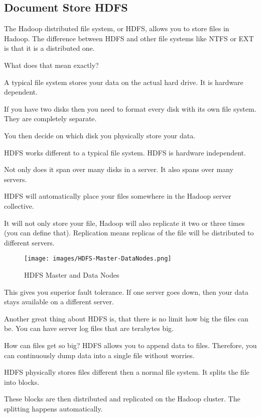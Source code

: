 \documentclass[12pt, numbers=noenddot]{scrreprt} %
\begin{document}
\subsection{Document Store HDFS}

The Hadoop distributed file system, or HDFS, allows you to store files in Hadoop. The difference between HDFS and other file systems like NTFS or EXT is that it is a distributed one.

What does that mean exactly?

A typical file system stores your data on the actual hard drive. It is hardware dependent.

If you have two disks then you need to format every disk with its own file system. They are completely separate.

You then decide on which disk you physically store your data.

HDFS works different to a typical file system. HDFS is hardware independent.

Not only does it span over many disks in a server. It also spans over many servers.

HDFS will automatically place your files somewhere in the Hadoop server collective.

It will not only store your file, Hadoop will also replicate it two or three times (you can define that). Replication means replicas of the file will be distributed to different servers.

\begin{figure}[htbp]
  \centering
     \texttt{[image: images/HDFS-Master-DataNodes.png]}
  \caption{HDFS Master and Data Nodes}
  \label{fig:Bild1}
\end{figure}

This gives you superior fault tolerance. If one server goes down, then your data stays available on a different server.

Another great thing about HDFS is, that there is no limit how big the files can be. You can have server log files that are terabytes big.

How can files get so big? HDFS allows you to append data to files. Therefore, you can continuously dump data into a single file without worries.

HDFS physically stores files different then a normal file system. It splits the file into blocks.

These blocks are then distributed and replicated on the Hadoop cluster. The splitting happens automatically.
\end{document}
